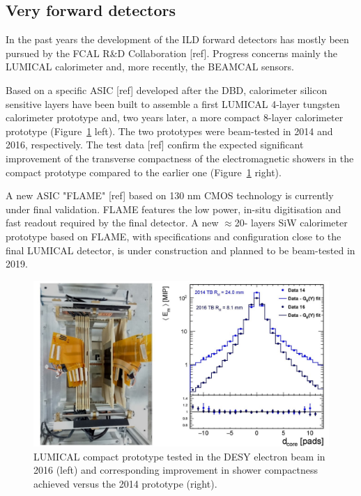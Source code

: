 \subsection{Very forward detectors}

In the past years the development of the ILD forward detectors has mostly been pursued by the FCAL R\&D Collaboration [ref]. Progress concerns mainly the LUMICAL calorimeter and, more recently, the BEAMCAL sensors.

Based on a specific ASIC [ref] developed after the DBD, calorimeter silicon sensitive layers have been built to assemble a first LUMICAL 4-layer tungsten calorimeter prototype and, two years later, a more compact 8-layer calorimeter prototype (Figure~\ref{fig:det:LUMICAL_perf} left). The two prototypes were beam-tested in 2014 and 2016, respectively. The test data [ref] confirm the expected significant improvement of the transverse compactness of the electromagnetic showers in the compact prototype compared to the earlier one (Figure~\ref{fig:det:LUMICAL_perf} right). 

A new ASIC "FLAME" [ref] based on 130 nm CMOS technology is currently under final validation. FLAME features the low power, in-situ digitisation and fast readout required by the final detector. A new $\approx$20- layers SiW calorimeter prototype based on FLAME, with specifications and configuration close to the final LUMICAL detector, is under construction and planned to be beam-tested in 2019. 

\begin{figure}[t!]
\centering
\includegraphics[width=1.0\hsize]{Detector/fig/LUMICAL_perf.jpg}
\caption{LUMICAL compact prototype tested in the DESY electron beam in 2016 (left) and corresponding improvement in shower compactness achieved versus the 2014 prototype (right).}
\label{fig:det:LUMICAL_perf}
\end{figure}

